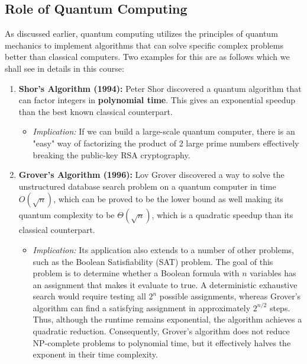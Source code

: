 \medskip
\noindent
{}
\medskip

\subsection{Role of Quantum Computing}
As discussed earlier, quantum computing utilizes the principles of quantum mechanics to implement algorithms that can solve specific complex problems better than classical computers. Two examples for this are as follows which we shall see in details in this course:
\begin{enumerate}
    \item \textbf{Shor's Algorithm (1994):} Peter Shor discovered a quantum algorithm that can factor integers in \textbf{polynomial time}. This gives an exponential speedup than the best known classical counterpart.
    \begin{itemize}
        \item \textit{Implication:} If we can build a large-scale quantum computer, there is an "easy" way of factorizing the product of 2 large prime numbers effectively breaking the public-key RSA cryptography. 
    \end{itemize}
    
    \item \textbf{Grover's Algorithm (1996):} Lov Grover discovered a way to solve the unstructured database search problem on a quantum computer in time $O(\sqrt{n})$, which can be proved to be the lower bound as well making its quantum complexity to be $\Theta(\sqrt{n})$, which is a quadratic speedup than its classical counterpart.
    \begin{itemize}
        \item \textit{Implication:} Its application also extends to a number of other problems, such as the Boolean Satisfiability (SAT) problem. The goal of this problem is to determine whether a Boolean formula with \( n \) variables has an assignment that makes it evaluate to true. A deterministic exhaustive search would require testing all \( 2^{n} \) possible assignments, whereas Grover’s algorithm can find a satisfying assignment in approximately \( 2^{n/2} \) steps. Thus, although the runtime remains exponential, the algorithm achieves a quadratic reduction. Consequently, Grover’s algorithm does not reduce NP-complete problems to polynomial time, but it effectively halves the exponent in their time complexity.
    \end{itemize}
\end{enumerate}

